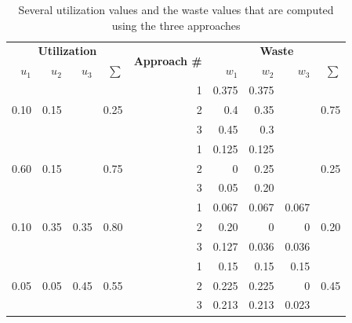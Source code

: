 \begin{table}
    \centering
    \begin{tabular}{|r|r|r|r|r|r|r|r|r|}
        \hline
        \multicolumn{4}{|c|}{\textbf{Utilization}} & \multirow{2}{*}{\textbf{Approach \#}} & \multicolumn{4}{|c|}{\textbf{Waste}} \\ 
        $u_1$ & $u_2$ & $u_3$ & $\sum$ & \multirow{2}{*}{} & $w_1$ & $w_2$ & $w_3$ & $\sum$ \\ \hline
        
        \multirow{3}{*}{0.10} & \multirow{3}{*}{0.15} &  & \multirow{3}{*}{0.25} 
        & 1 & 0.375 & 0.375 & &                            \multirow{3}{*}{0.75} \\
        \multirow{3}{*}{}     & \multirow{3}{*}{}     & & \multirow{3}{*}{}
        & 2 & 0.4 & 0.35 & & \multirow{3}{*}{} \\
        \multirow{3}{*}{}     & \multirow{3}{*}{}     & & \multirow{3}{*}{}
        & 3 & 0.45 & 0.3 & & \multirow{3}{*}{} \\ \hline
        
        \multirow{3}{*}{0.60} & \multirow{3}{*}{0.15} &  & \multirow{3}{*}{0.75} 
        & 1 & 0.125 & 0.125 & &                            \multirow{3}{*}{0.25} \\
        \multirow{3}{*}{}     & \multirow{3}{*}{}     & & \multirow{3}{*}{}
        & 2 & 0 & 0.25 & & \multirow{3}{*}{} \\
        \multirow{3}{*}{}     & \multirow{3}{*}{}     & & \multirow{3}{*}{}
        & 3 & 0.05 & 0.20 & & \multirow{3}{*}{} \\ \hline
        
        \multirow{3}{*}{0.10} & \multirow{3}{*}{0.35} & \multirow{3}{*}{0.35} & \multirow{3}{*}{0.80} 
        & 1 & 0.067 & 0.067 & 0.067 & \multirow{3}{*}{0.20} \\
        \multirow{3}{*}{}     & \multirow{3}{*}{}     & \multirow{3}{*}{} & \multirow{3}{*}{}
        & 2 & 0.20 & 0 & 0 & \multirow{3}{*}{} \\
        \multirow{3}{*}{}     & \multirow{3}{*}{}     & \multirow{3}{*}{} & \multirow{3}{*}{}
        & 3 & 0.127 & 0.036 & 0.036 & \multirow{3}{*}{} \\ \hline
        
        \multirow{3}{*}{0.05} & \multirow{3}{*}{0.05} & \multirow{3}{*}{0.45} & \multirow{3}{*}{0.55} 
        & 1 & 0.15 & 0.15 & 0.15 & \multirow{3}{*}{0.45} \\
        \multirow{3}{*}{}     & \multirow{3}{*}{}     & \multirow{3}{*}{} & \multirow{3}{*}{}
        & 2 & 0.225 & 0.225 & 0 & \multirow{3}{*}{} \\
        \multirow{3}{*}{}     & \multirow{3}{*}{}     & \multirow{3}{*}{} & \multirow{3}{*}{}
        & 3 & 0.213 & 0.213 & 0.023 & \multirow{3}{*}{} \\ \hline
        
    \end{tabular}
    \caption{Several utilization values and the waste values that are computed using the three approaches}
    \label{tab:values}
\end{table}

